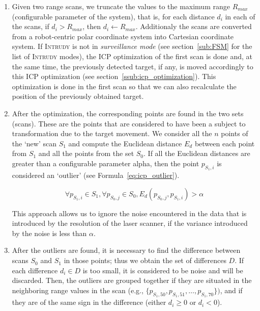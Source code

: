 \documentclass[12pt,a4paper]{scrartcl}
\newcommand{\intrudy}{\textsc{Intrudy}\xspace}
\begin{document}
\begin{enumerate}
	\item Given two range scans, we truncate the values to the maximum range $R_{max}$ (configurable parameter of the system), that is, for each distance $d_i$ in each of the scans, if $d_i > R_{max}$, then $d_i \gets R_{max} $. Additionaly the scans are converted from a robot-centric polar coordinate system into Cartesian coordinate system.
	If \intrudy is not in \textit{surveillance mode} (see section~\ref{sub:FSM} for the list of \intrudy modes), the ICP optimization of the first scan is done and, at the same time, the previously detected target, if any, is moved accordingly to this ICP optimization (see section~\ref{ssub:icp_optimization}). This optimization is done in the first scan so that we can also recalculate the position of the previously obtained target.

	\item After the optimization, the corresponding points are found in the two sets (scans). These are the points that are considered to have been a subject to transformation due to the target movement. 
	We consider all the $n$ points of the `new' scan $S_1$ and compute the Euclidean distance $E_d$ between each point from $S_1$ and all the points from the set $S_0$. If all the Euclidean distances are greater than a configurable parameter alpha, then the point $p_{S_1, i}$ is considered an `outlier' (see Formula~\ref{eq:icp_outlier}).
	
	\begin{equation} 
	\label{eq:icp_outlier}
	\forall p_{S_1, i} \in S_1, \forall p_{S_0, j} \in S_0, E_d(p_{S_0, j}, p_{S_1, i}) > \alpha
	\end{equation}

	This approach allows us to ignore the noise encountered in the data that is introduced by the resolution of the laser scanner, if the variance introduced by the noise is less than $\alpha$.

	\item After the outliers are found, it is necessary to find the difference between scans $S_0$ and $S_1$ in those points; thus we obtain the set of differences $D$. If each difference $d_i \in D$ is too small, it is considered to be noise and will be discarded. Then, the outliers are grouped together if they are situated in the neighboring range values in the scan (e.g., $\{p_{S_1, 50}, p_{S_1, 51}, \dots, p_{S_1, 70}\})$, and if they are of the same sign in the difference (either $d_i \geq 0$ or $d_i<0$). 


\end{enumerate}
\end{document}

